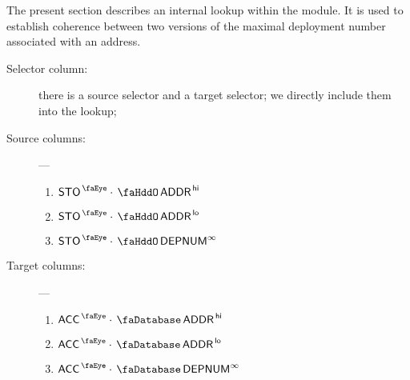 The present section describes an internal lookup within the \hubMod{} module.
It is used to establish coherence between two versions of the maximal deployment number associated with an address.
\begin{description}
	\item[Selector column:]
		there is a source selector and a target selector;
		we directly include them into the lookup;
	\item[Source columns:] ---
		\begin{multicols}{3}
			\begin{enumerate}
				\item $\peekStorage \cdot \stoAddressHi$
				\item $\peekStorage \cdot \stoAddressLo$
				\item $\peekStorage \cdot \stoDeploymentNumber^\infty$
			\end{enumerate}
		\end{multicols}
	\item[Target columns:] ---
		\begin{multicols}{3}
			\begin{enumerate}
				\item $\peekAccount \cdot \accAddressHi$
				\item $\peekAccount \cdot \accAddressLo$
				\item $\peekAccount \cdot \accDeploymentNumber^\infty$
			\end{enumerate}
		\end{multicols}
\end{description}
